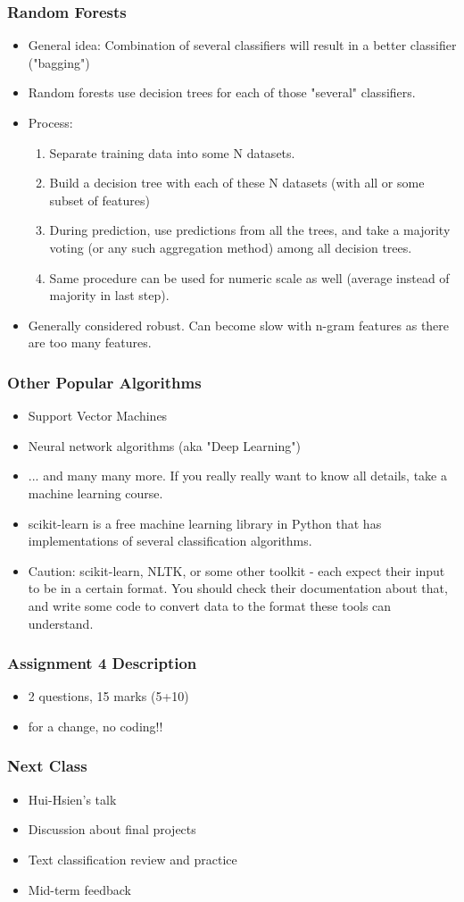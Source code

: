 \documentclass{beamer}
\begin{document}
\begin{frame}
\frametitle{Random Forests}
\begin{itemize}
\item General idea: Combination of several classifiers will result in a better classifier ("bagging")
\item Random forests use decision trees for each of those "several" classifiers. \pause
\item Process:
\begin{enumerate}
\item Separate training data into some N datasets.
\item Build a decision tree with each of these N datasets (with all or some subset of features)
\item During prediction, use predictions from all the trees, and take a majority voting (or any such aggregation method) among all decision trees.
\item Same procedure can be used for numeric scale as well (average instead of majority in last step).
\end{enumerate} 
\item Generally considered robust. Can become slow with n-gram features as there are too many features. 
\end{itemize}
\end{frame}

\begin{frame}
\frametitle{Other Popular Algorithms}
\begin{itemize} 
\item Support Vector Machines
\item Neural network algorithms (aka "Deep Learning")
\item ... and many many more. If you really really want to know all details, take a machine learning course.
\item scikit-learn is a free machine learning library in Python that has implementations of several classification algorithms. \pause
\item Caution: scikit-learn, NLTK, or some other toolkit - each expect their input to be in a certain format. You should check their documentation about that, and write some code to convert data to the format these tools can understand.
\end{itemize}
\end{frame}

\begin{frame}
\frametitle{Assignment 4 Description}
\begin{itemize}
\item 2 questions, 15 marks (5+10)
\item for a change, no coding!!
\end{itemize}
\end{frame}

\begin{frame}
\frametitle{Next Class}
\begin{itemize}
\item Hui-Hsien's talk
\item Discussion about final projects
\item Text classification review and practice
\item Mid-term feedback
\end{itemize}
\end{frame}
\end{document}
